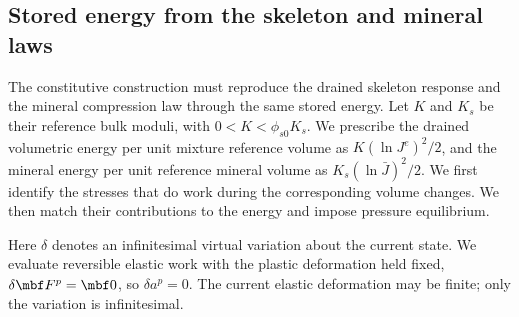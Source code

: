 \subsection{Stored energy from the skeleton and mineral laws}
\label{sec:elastic-verification-closure}
\label{sec:numerical-solid-eos}

The constitutive construction must reproduce the drained skeleton response
and the mineral compression law through the same stored energy.  Let \(K\)
and \(K_s\) be their reference bulk moduli, with
\(0<K<\phi_{s0}K_s\).  We prescribe the drained volumetric energy per unit
mixture reference volume as \(K(\ln J^e)^2/2\), and the mineral
energy per unit reference mineral volume as
\(K_s(\ln\bar J)^2/2\).  We first identify the stresses that do work during the corresponding
volume changes.  We then match their contributions to the energy and impose
pressure equilibrium.

Here \(\delta\) denotes an infinitesimal virtual variation about the current
state.  We evaluate reversible elastic work with the plastic deformation
held fixed, \(\delta\mbf F^p=\mbf0\), so \(\delta a^p=0\).
The current elastic deformation may be finite; only the variation is
infinitesimal.

